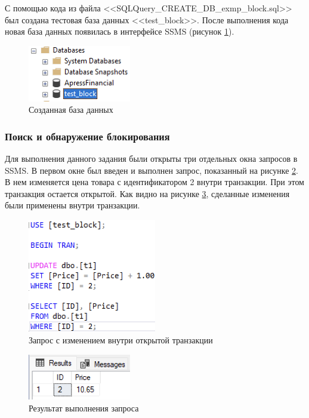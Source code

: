 \documentclass[a4paper, 14pt]{extarticle}
\begin{document}
С помощью кода из файла
<<\foreignlanguage{english}{SQLQuery\_CREATE\_DB\_exmp\_block.sql}>> был создана
тестовая база данных <<\foreignlanguage{english}{test\_block}>>. После
выполнения кода новая база данных появилась в интерфейсе SSMS (рисунок
\ref{fig:task-2-1}).

\begin{figure}[H]
  \centering
  \includegraphics[width=0.4\textwidth]{images/task-2/1.png}
  \caption{Созданная база данных}
  \label{fig:task-2-1}
\end{figure}

\subsubsection{Поиск и обнаружение блокирования}

Для выполнения данного задания были открыты три отдельных окна запросов в SSMS.
В первом окне был введен и выполнен запрос, показанный на рисунке
\ref{fig:task-2-2}. В нем изменяется цена товара с идентификатором 2 внутри
транзакции. При этом транзакция остается открытой. Как видно на рисунке
\ref{fig:task-2-3}, сделанные изменения были применены внутри транзакции.

\begin{figure}[H]
  \centering
  \includegraphics[width=0.5\textwidth]{images/task-2/2.png}
  \caption{Запрос с изменением внутри открытой транзакции}
  \label{fig:task-2-2}
\end{figure}

\begin{figure}[H]
  \centering
  \includegraphics[width=0.4\textwidth]{images/task-2/3.png}
  \caption{Результат выполнения запроса}
  \label{fig:task-2-3}
\end{figure}
\end{document}
